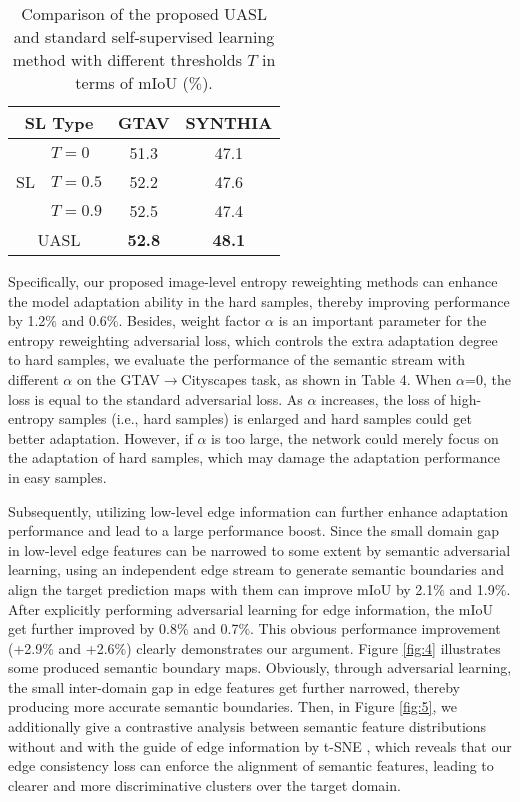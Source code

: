 \documentclass[sigconf]{acmart}
\begin{document}
\begin{table}
    \caption{Comparison of the proposed UASL and standard self-supervised learning method with different thresholds $T$ in terms of mIoU ($\%$).}
    \centering
    \begin{tabular}{l|l|cc}
    \toprule
    \multicolumn{2}{c|}{SL Type}  & GTAV & SYNTHIA \\
    \hline
    \multirow{3}{*}{SL} & $T=0$  & 51.3   & 47.1   \\
    ~ & $T=0.5$     & 52.2  & 47.6     \\
    ~ & $T=0.9$     & 52.5 &  47.4  \\
    \hline
    \multicolumn{2}{c|}{UASL}  & \textbf{52.8}  & \textbf{48.1}     \\
    \toprule
    \end{tabular}
    
    \label{tab:5}
\end{table}
\par Specifically, our proposed image-level entropy reweighting methods can enhance the model adaptation ability in the hard samples, thereby improving performance by 1.2$\%$ and 0.6$\%$. Besides, weight factor $\alpha$ is an important parameter for the entropy reweighting adversarial loss, which controls the extra adaptation degree to hard samples, we evaluate the performance of the semantic stream with different $\alpha$ on the GTAV$\rightarrow$Cityscapes task, as shown in Table 4. When $\alpha$=0, the loss is equal to the standard adversarial loss. As $\alpha$ increases, the loss of high-entropy samples (i.e., hard samples) is enlarged and hard samples could get better adaptation. However, if $\alpha$ is too large, the network could merely focus on the adaptation of hard samples, which may damage the adaptation performance in easy samples. 

\par Subsequently, utilizing low-level edge information can further enhance adaptation performance and lead to a large performance boost. Since the small domain gap in low-level edge features can be narrowed to some extent by semantic adversarial learning, using an independent edge stream to generate semantic boundaries and align the target prediction maps with them can improve mIoU by 2.1$\%$ and 1.9$\%$. After explicitly performing adversarial learning for edge information, the mIoU get further improved by 0.8$\%$ and 0.7$\%$. This obvious performance improvement (+2.9$\%$ and +2.6$\%$) clearly demonstrates our argument. Figure \ref{fig:4} illustrates some produced semantic boundary maps. Obviously, through adversarial learning, the small inter-domain gap in edge features get further narrowed, thereby producing more accurate semantic boundaries. Then, in Figure \ref{fig:5}, we additionally give a contrastive analysis between semantic feature distributions without and with the guide of edge information by t-SNE \cite{van2008visualizing}, which reveals that our edge consistency loss can enforce the alignment of semantic features, leading to clearer and more discriminative clusters over the target domain. 
\end{document}
